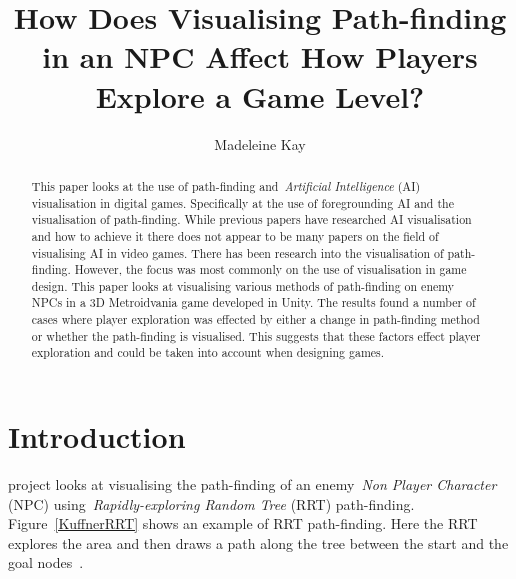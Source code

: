 \documentclass[journal]{IEEEtran}
\begin{document}
	\title{ How Does Visualising Path-finding in an NPC Affect How Players Explore a Game Level?}
	\author{Madeleine Kay}
	
	
	\maketitle
	
	\begin{abstract}
		This paper looks at the use of path-finding and~\textit{Artificial Intelligence} (AI) visualisation in digital games.   Specifically at the use of foregrounding AI and the visualisation of path-finding. 
		While previous papers have researched AI visualisation and how to achieve it there does not appear to be many papers on the field of visualising AI in video games. There has been research into the visualisation of path-finding. However, the focus was most commonly on the use of visualisation in game design. 
		This paper looks at visualising various methods of path-finding on enemy NPCs in a 3D Metroidvania game developed in Unity.
		The results found a number of cases where player exploration was effected by either a change in path-finding method or whether the path-finding is visualised. This suggests that these factors effect player exploration and could be taken into account when designing games.
		
	\end{abstract}
	
	\section{Introduction} \label{introduction}
	 project looks at visualising the path-finding of an enemy~\textit{Non Player Character} (NPC) using~\textit{Rapidly-exploring Random Tree} (RRT) path-finding.  Figure~\ref{KuffnerRRT} shows an example of RRT path-finding. Here the RRT explores the area and then draws a path along the tree between the start and the goal nodes~\cite{Kuffner2000}. 
	
\end{document}
